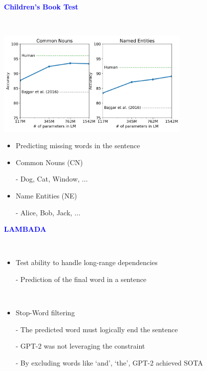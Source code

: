 \documentclass[professionalfont]{beamer}
\begin{document}
\begin{frame}

\begin{center}
    { \textbf{\textcolor{blue}{ {\fontsize{12}{14}\selectfont Children’s Book Test} }} }
\end{center}
\\[0.3cm]
\begin{center}
    \includegraphics[width=0.7\textwidth]{figure2.png}
\end{center}

{\fontsize{10}{14}\selectfont 
\begin{itemize}
    \item Predicting missing words in the sentence

    \item Common Nouns (CN)
    
    - Dog, Cat, Window, ...

    \item Name Entities (NE)
    
    - Alice, Bob, Jack, ...

\end{itemize}
}

\end{frame}

\begin{frame}

\begin{center}
    { \textbf{\textcolor{blue}{ {\fontsize{12}{14}\selectfont LAMBADA} }} }
\end{center}
\\[0.3cm]

{\fontsize{10}{14}\selectfont 
\begin{itemize}
    \item Test ability to handle long-range dependencies

    - Prediction of the final word in a sentence

    \\[0.3cm]

    \item Stop-Word filtering

    - The predicted word must logically end the sentence
    
    - GPT-2 was not leveraging the constraint

    - By excluding words like `and', `the', GPT-2 achieved SOTA

\end{itemize}
}

\end{frame}
\end{document}
